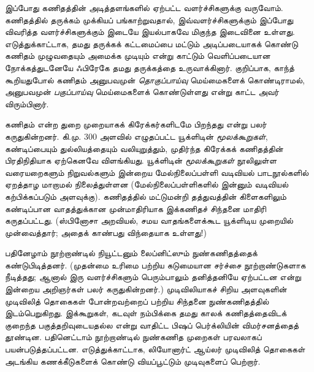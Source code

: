 \documentclass[../../../include/open-logic-section]{subfiles}
\begin{document}
இப்போது கணிதத்தின் அடித்தளங்களில் ஏற்பட்ட வளர்ச்சிகளுக்கு வருவோம். கணிதத்தில்
தருக்கம் முக்கியப் பங்காற்றுவதால், இவ்வளர்ச்சிகளுக்கும் இப்போது விவரித்த
வளர்ச்சிகளுக்கும் இடையே இயல்பாகவே மிகுந்த இடைவினை உள்ளது. எடுத்துக்காட்டாக,
தமது தருக்கக் கட்டமைப்பை மட்டும் அடிப்படையாகக் கொண்டு கணிதம் முழுவதையும்
அமைக்க முடியும் என்று காட்டும் வெளிப்படையான நோக்கத்துடனேயே ஃபிரேகே தமது
தருக்கத்தை உருவாக்கினார். குறிப்பாக, காந்த் கூறியதுபோல் கணிதம் அனுபவமுன்
\emph{தொகுப்பாய்வு} மெய்மைகளைக் கொண்டிராமல், அனுபவமுன் \emph{பகுப்பாய்வு}
மெய்மைகளைக் கொண்டுள்ளது என்று காட்ட அவர் விரும்பினார்.

கணிதம் என்ற துறை முறையாகக் கிரேக்கர்களிடமே பிறந்தது என்று பலர் கருதுகின்றனர்.
கி.மு. 300 அளவில் எழுதப்பட்ட யூக்ளிடின் \emph{மூலக்கூறுகள்}, கண்டிப்பையும்
துல்லியத்தையும் வலியுறுத்தும், முதிர்ந்த கிரேக்கக் கணிதத்தின் பிரதிநிதியாக
ஏற்கெனவே விளங்கியது. யூக்ளிடின் \emph{மூலக்கூறுகள்} நூலிலுள்ள வரையறைகளும்
நிறுவல்களும் இன்றைய மேல்நிலைப்பள்ளி வடிவியல் பாடநூல்களில் ஏறத்தாழ மாறாமல்
நிலைத்துள்ளன (மேல்நிலைப்பள்ளிகளில் இன்னும் வடிவியல் கற்பிக்கப்படும் அளவுக்கு).
கணிதத்தில் மட்டுமன்றி தத்துவத்தின் கிளைகளிலும் கண்டிப்பான வாதத்துக்கான
முன்மாதிரியாக இக்கணிதச் சிந்தனை மாதிரி கருதப்பட்டது. (ஸ்பினோசா அறவியல்,
சமய வாதங்களைக்கூட யூக்ளிடிய முறையில் முன்வைத்தார்; அதைக் காண்பது
விந்தையாக உள்ளது!)

பதினேழாம் நூற்றாண்டில் நியூட்டனும் லைப்னிட்ஸும் நுண்கணிதத்தைக்
கண்டுபிடித்தனர். (முதன்மை உரிமை பற்றிய கடுமையான சர்ச்சை நூற்றாண்டுகளாக
நீடித்தது; ஆனால் இரு வளர்ச்சிகளும் பெரும்பாலும் தனித்தனியே ஏற்பட்டன என்று
இன்றைய அறிஞர்கள் பலர் கருதுகின்றனர்.) முடிவிலியாகச் சிறிய அளவுகளின் முடிவிலித்
தொகைகள் போன்றவற்றைப் பற்றிய சிந்தனை நுண்கணிதத்தில் இடம்பெறுகிறது. இக்கூறுகள்,
கடவுள் நம்பிக்கை தமது காலக் கணிதத்தைவிடக் குறைந்த பகுத்தறிவுடையதல்ல என்று
வாதிட்ட பிஷப் பெர்க்லியின் விமர்சனத்தைத் தூண்டின. பதினெட்டாம் நூற்றாண்டில்
நுண்கணித முறைகள் பரவலாகப் பயன்படுத்தப்பட்டன. எடுத்துக்காட்டாக, லியோனார்ட்
ஆய்லர் முடிவிலித் தொகைகள் அடங்கிய கணக்கீடுகளைக் கொண்டு வியப்பூட்டும்
முடிவுகளைப் பெற்றார்.
\end{document}
